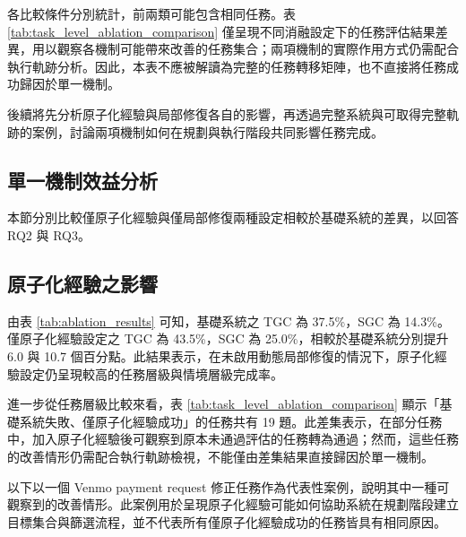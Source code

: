 \begin{ZhChapter}
各比較條件分別統計，前兩類可能包含相同任務。表 \ref{tab:task_level_ablation_comparison} 僅呈現不同消融設定下的任務評估結果差異，用以觀察各機制可能帶來改善的任務集合；兩項機制的實際作用方式仍需配合執行軌跡分析。因此，本表不應被解讀為完整的任務轉移矩陣，也不直接將任務成功歸因於單一機制。

後續將先分析原子化經驗與局部修復各自的影響，再透過完整系統與可取得完整軌跡的案例，討論兩項機制如何在規劃與執行階段共同影響任務完成。

\subsection{單一機制效益分析}

本節分別比較僅原子化經驗與僅局部修復兩種設定相較於基礎系統的差異，以回答 RQ2 與 RQ3。

\subsection*{原子化經驗之影響}

由表 \ref{tab:ablation_results} 可知，基礎系統之 TGC 為 37.5\%，SGC 為 14.3\%。僅原子化經驗設定之 TGC 為 43.5\%，SGC 為 25.0\%，相較於基礎系統分別提升 6.0 與 10.7 個百分點。此結果表示，在未啟用動態局部修復的情況下，原子化經驗設定仍呈現較高的任務層級與情境層級完成率。

進一步從任務層級比較來看，表 \ref{tab:task_level_ablation_comparison} 顯示「基礎系統失敗、僅原子化經驗成功」的任務共有 19 題。此差集表示，在部分任務中，加入原子化經驗後可觀察到原本未通過評估的任務轉為通過；然而，這些任務的改善情形仍需配合執行軌跡檢視，不能僅由差集結果直接歸因於單一機制。

以下以一個 Venmo payment request 修正任務作為代表性案例，說明其中一種可觀察到的改善情形。此案例用於呈現原子化經驗可能如何協助系統在規劃階段建立目標集合與篩選流程，並不代表所有僅原子化經驗成功的任務皆具有相同原因。


\end{ZhChapter}

